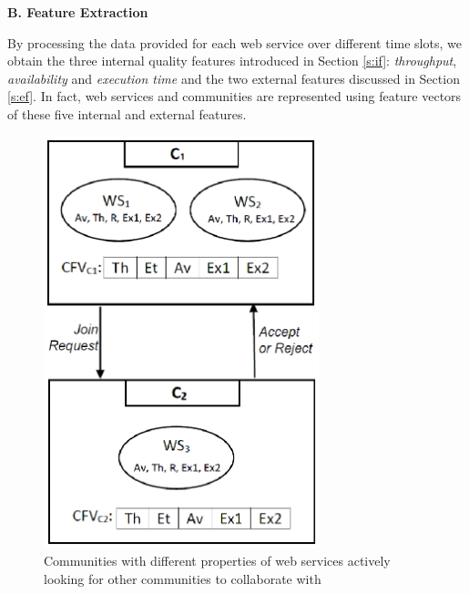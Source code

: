 \bigskip
\noindent \textbf {B. Feature Extraction}\label{sss:filtereddata}

By processing the data provided for each web service over different time slots, we obtain the three internal quality features introduced in Section \ref{s:if}: \emph{throughput}, \emph{availability} and \emph{execution time} and the two external features discussed in Section \ref{s:ef}.  In fact, web services and communities are represented using feature vectors of these five internal and external features.


\begin{figure}%
\centerline{\includegraphics[width=3.15in]{figures/cfvs.eps}}
\caption{Communities with different properties of web services actively looking for other communities to collaborate with}
\label{fig_community}
\end{figure}



